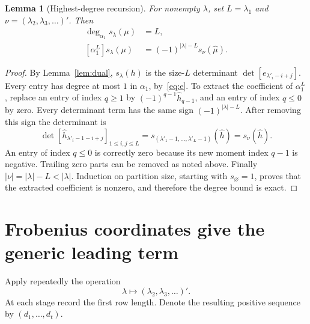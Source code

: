 \documentclass[11pt]{article}
\newtheorem{lemma}[theorem]{Lemma}
\theoremstyle{definition}
\theoremstyle{remark}
\begin{document}
\begin{lemma}[Highest-degree recursion]\label{lem:peel}
For nonempty $\lambda$, set $L=\lambda_1$ and
$\nu=(\lambda_2,\lambda_3,\ldots)'$. Then
\begin{align}
 \deg_{\alpha_1}s_\lambda(\mu)&=L,\label{eq:degreealpha}\\
 [\alpha_1^L]s_\lambda(\mu)
 &=(-1)^{|\lambda|-L}s_\nu(\widehat\mu).\label{eq:peel}
\end{align}
\end{lemma}
\begin{proof}
By Lemma~\ref{lem:dual}, $s_\lambda(h)$ is the size-$L$ determinant
$\det[e_{\lambda'_i-i+j}]$. Every entry has degree at most $1$ in
$\alpha_1$, by~\eqref{eq:e}. To extract the coefficient of $\alpha_1^L$,
replace an entry of index $q\ge1$ by $(-1)^{q-1}\widehat h_{q-1}$,
and an entry of index $q\le0$ by zero. Every determinant term has the
same sign $(-1)^{|\lambda|-L}$.
After removing this sign the determinant is
\[
 \det[\widehat h_{\lambda'_i-1-i+j}]_{1\le i,j\le L}
 =s_{(\lambda'_1-1,\ldots,\lambda'_L-1)}(\widehat h)
 =s_\nu(\widehat h).
\]
An entry of index $q\le0$ is correctly zero because its new moment index
$q-1$ is negative. Trailing zero parts can be removed as noted above.
Finally $|\nu|=|\lambda|-L<|\lambda|$. Induction on partition size,
starting with $s_\varnothing=1$, proves that the extracted coefficient is
nonzero, and therefore the degree bound is exact.
\end{proof}

\section{Frobenius coordinates give the generic leading term}
Apply repeatedly the operation
\[
 \lambda\longmapsto(\lambda_2,\lambda_3,\ldots)'.
\]
At each stage record the first row length. Denote the resulting positive
sequence by $(d_1,\ldots,d_t)$.
\end{document}
